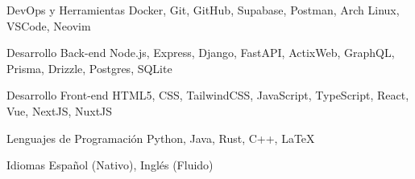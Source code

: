 
\begin{cvskills}
  \cvskill
    {DevOps y Herramientas}
    {Docker, Git, GitHub, Supabase, Postman, Arch Linux, VSCode, Neovim}

  \cvskill
    {Desarrollo Back-end}
    {Node.js, Express, Django, FastAPI, ActixWeb, GraphQL, Prisma, Drizzle, Postgres, SQLite}

  \cvskill
    {Desarrollo Front-end}
    {HTML5, CSS, TailwindCSS, JavaScript, TypeScript, React, Vue, NextJS, NuxtJS}

  \cvskill
    {Lenguajes de Programación}
    {Python, Java, Rust, C++, LaTeX}

  \cvskill
    {Idiomas}
    {Español (Nativo), Inglés (Fluido)}
\end{cvskills}

